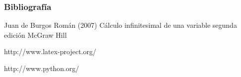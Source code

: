 \documentclass{beamer}
\begin{document}
\begin{frame}
  \frametitle{Bibliografía}

  \begin{thebibliography}{10}

    \beamertemplatebookbibitems
    Juan de Burgos Román (2007) Cálculo infinitesimal de una variable segunda edición McGraw Hill
    
    \beamertemplatebookbibitems
    http://www.latex-project.org/
    
    \beamertemplatebookbibitems
    http://www.python.org/
    
      
    
      \end{thebibliography}
\end{frame}


\end{document}
